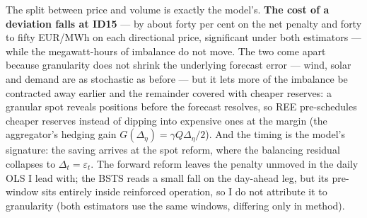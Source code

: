 \documentclass[11pt,a4paper]{article}
\theoremstyle{definition}
\theoremstyle{remark}
\theoremstyle{plain}
\begin{document}
The split between price and volume is exactly the model's. \textbf{The cost of a deviation falls at ID15} --- by about forty per cent on the net penalty and forty to fifty EUR/MWh on each directional price, significant under both estimators --- while the megawatt-hours of imbalance do not move. The two come apart because granularity does not shrink the underlying forecast error --- wind, solar and demand are as stochastic as before --- but it lets more of the imbalance be contracted away earlier and the remainder covered with cheaper reserves: a granular spot reveals positions before the forecast resolves, so REE pre-schedules cheaper reserves instead of dipping into expensive ones at the margin (the aggregator's hedging gain $G(\Delta_\eta) = \gamma Q\Delta_\eta/2$). And the timing is the model's signature: the saving arrives at the spot reform, where the balancing residual collapses to $\Delta_t = \varepsilon_t$. The forward reform leaves the penalty unmoved in the daily OLS I lead with; the BSTS reads a small fall on the day-ahead leg, but its pre-window sits entirely inside reinforced operation, so I do not attribute it to granularity (both estimators use the same windows, differing only in method).
\end{document}
